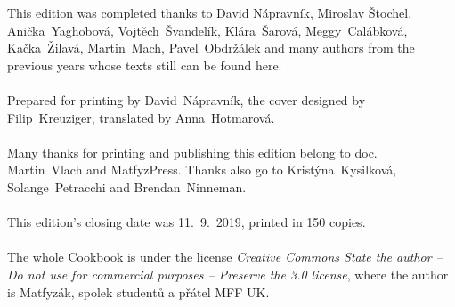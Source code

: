 \tableofcontents
{}
\vspace*{\fill}
\noindent This edition was completed thanks to David Nápravník, Miroslav
Štochel,
Anička~Yaghobová, Vojtěch~Švandelík, Klára~Šarová, Meggy~Calábková,
Kačka~Žilavá, Martin~Mach, Pavel~Obdržálek
and many authors from the previous years whose texts still can be found here.
\\\\
Prepared for printing by David~Nápravník, the cover designed by Filip~Kreuziger,
translated by Anna~Hotmarová.
\\\\
Many thanks for printing and publishing this edition belong to doc. Martin~Vlach
and MatfyzPress. Thanks also go to Kristýna~Kysilková, Solange~Petracchi and
Brendan~Ninneman.
\\\\
This edition's closing date was 11.~9.~2019, printed in 150 copies.
\\\\
The whole Cookbook is under the license \textit{Creative Commons State the
author -- Do not use for commercial purposes -- Preserve the 3.0 license}, where
the author is Matfyzák,
spolek studentů a přátel MFF UK.
\newpage
{}